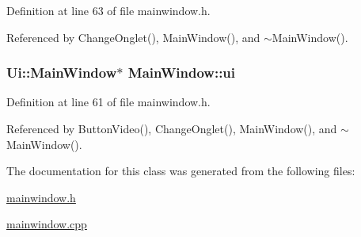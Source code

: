 Definition at line 63 of file mainwindow.\-h.



Referenced by Change\-Onglet(), Main\-Window(), and $\sim$\-Main\-Window().

\hypertarget{classMainWindow_a35466a70ed47252a0191168126a352a5}{
\subsubsection[{ui}]{\setlength{\rightskip}{0pt plus 5cm}Ui\-::\-Main\-Window$\ast$ Main\-Window\-::ui\hspace{0.3cm}{\ttfamily [private]}}}\label{classMainWindow_a35466a70ed47252a0191168126a352a5}


Definition at line 61 of file mainwindow.\-h.



Referenced by Button\-Video(), Change\-Onglet(), Main\-Window(), and $\sim$\-Main\-Window().



The documentation for this class was generated from the following files\-:\begin{DoxyCompactItemize}
\item 
\hyperlink{mainwindow_8h}{mainwindow.\-h}\item 
\hyperlink{mainwindow_8cpp}{mainwindow.\-cpp}\end{DoxyCompactItemize}
